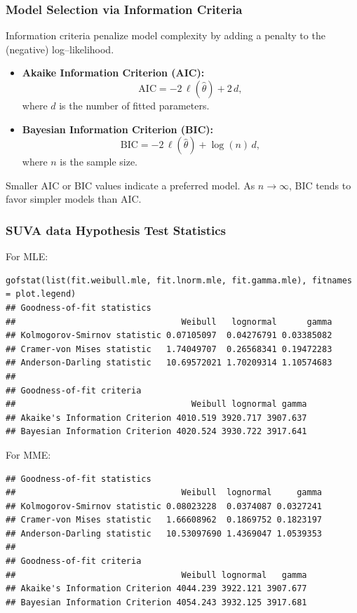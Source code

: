 \documentclass[11pt]{article}
\newcommand{\noi}{\noindent}
\begin{document}
\subsubsection{Model Selection via Information Criteria}

Information criteria penalize model complexity by adding a penalty to the (negative) log–likelihood.

\begin{itemize}
  \item \textbf{Akaike Information Criterion (AIC):}
    \[
      \mathrm{AIC} = -2\,\ell(\widehat\theta) + 2\,d,
    \]
    where \(d\) is the number of fitted parameters.
  \item \textbf{Bayesian Information Criterion (BIC):}
    \[
      \mathrm{BIC} = -2\,\ell(\widehat\theta) + \log(n)\,d,
    \]
    where \(n\) is the sample size.
\end{itemize} \phantom{i}

\noi Smaller AIC or BIC values indicate a preferred model.  As \(n\to\infty\), BIC tends to favor simpler models than AIC.  

\subsubsection{SUVA data Hypothesis Test Statistics}
\noi For MLE:
\begin{lstlisting}
gofstat(list(fit.weibull.mle, fit.lnorm.mle, fit.gamma.mle), fitnames = plot.legend)
## Goodness-of-fit statistics
##                                 Weibull   lognormal      gamma
## Kolmogorov-Smirnov statistic 0.07105097  0.04276791 0.03385082
## Cramer-von Mises statistic   1.74049707  0.26568341 0.19472283
## Anderson-Darling statistic   10.69572021 1.70209314 1.10574683
##
## Goodness-of-fit criteria
##                                   Weibull lognormal gamma
## Akaike's Information Criterion 4010.519 3920.717 3907.637
## Bayesian Information Criterion 4020.524 3930.722 3917.641
\end{lstlisting}

\noi For MME:
\begin{lstlisting}
## Goodness-of-fit statistics
##                                 Weibull  lognormal     gamma
## Kolmogorov-Smirnov statistic 0.08023228  0.0374087 0.0327241
## Cramer-von Mises statistic   1.66608962  0.1869752 0.1823197
## Anderson-Darling statistic   10.53097690 1.4369047 1.0539353
##
## Goodness-of-fit criteria
##                                 Weibull lognormal   gamma
## Akaike's Information Criterion 4044.239 3922.121 3907.677
## Bayesian Information Criterion 4054.243 3932.125 3917.681
\end{lstlisting}
\end{document}
